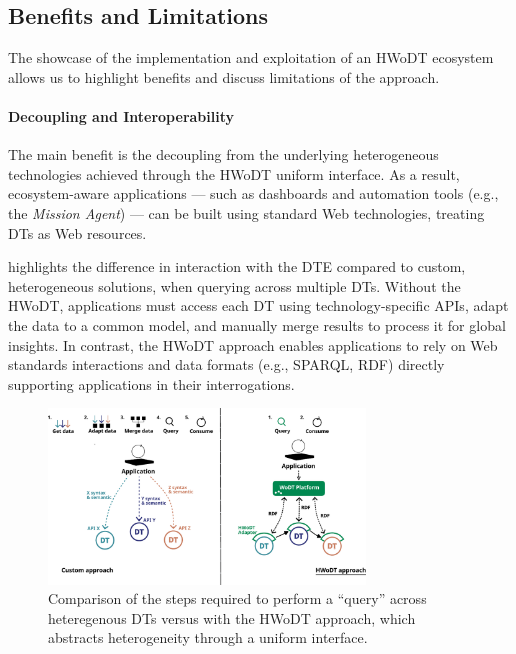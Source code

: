 

\subsection{Benefits and Limitations}
\label{ssec:benefits-limitations}


The showcase of the implementation and exploitation of an \ac{HWoDT} ecosystem allows us to highlight benefits and discuss limitations of the approach.

\paragraph{Decoupling and Interoperability}
The main benefit is the decoupling from the underlying heterogeneous technologies achieved through the \ac{HWoDT} uniform interface.
%
As a result, ecosystem-aware applications — such as dashboards and automation tools (e.g., the \emph{Mission Agent}) — can be built using standard Web technologies, treating \acp{DT} as Web resources.

 highlights the difference in interaction with the \ac{DTE} compared to custom, heterogeneous solutions, when querying across multiple \acp{DT}.
%
Without the \ac{HWoDT}, applications must access each \ac{DT} using technology-specific \acp{API}, adapt the data to a common model, and manually merge results to process it for global insights.
In contrast, the \ac{HWoDT} approach enables applications to rely on Web standards interactions and data formats (e.g., SPARQL, \ac{RDF}) directly supporting applications in their interrogations.

\begin{figure}[ht]
  \centering
  \includegraphics[width=0.75\textwidth]{figures/hwodt/comparison_custom_hwodt.pdf}
  \caption{Comparison of the steps required to perform a ``query'' across heteregenous \acp{DT} versus with the \ac{HWoDT} approach, which abstracts heterogeneity through a uniform interface.}
  \label{fig:comparison-custom-vs-hwodt}
\end{figure}

